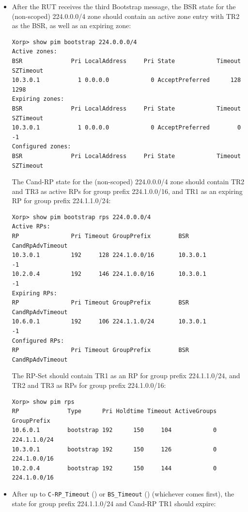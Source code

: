 \documentclass[11pt]{report}
\begin{document}
\begin{itemize}
  \item After the RUT receives the third Bootstrap message, the BSR state for
  the (non-scoped) 224.0.0.0/4 zone should contain an active zone entry with
  TR2 as the BSR, as well as an expiring zone:

\begin{verbatim}
Xorp> show pim bootstrap 224.0.0.0/4
Active zones:
BSR              Pri LocalAddress     Pri State            Timeout SZTimeout
10.3.0.1           1 0.0.0.0            0 AcceptPreferred      128      1298
Expiring zones:
BSR              Pri LocalAddress     Pri State            Timeout SZTimeout
10.3.0.1           1 0.0.0.0            0 AcceptPreferred        0        -1
Configured zones:
BSR              Pri LocalAddress     Pri State            Timeout SZTimeout
\end{verbatim}

  The Cand-RP state for the (non-scoped) 224.0.0.0/4 zone should
  contain TR2 and TR3 as active RPs for group prefix 224.1.0.0/16, and TR1 as
  an expiring RP for group prefix 224.1.1.0/24:

\begin{verbatim}
Xorp> show pim bootstrap rps 224.0.0.0/4
Active RPs:
RP               Pri Timeout GroupPrefix        BSR         CandRpAdvTimeout
10.3.0.1         192     128 224.1.0.0/16       10.3.0.1                  -1
10.2.0.4         192     146 224.1.0.0/16       10.3.0.1                  -1
Expiring RPs:
RP               Pri Timeout GroupPrefix        BSR         CandRpAdvTimeout
10.6.0.1         192     106 224.1.1.0/24       10.3.0.1                  -1
Configured RPs:
RP               Pri Timeout GroupPrefix        BSR         CandRpAdvTimeout
\end{verbatim}

  The RP-Set should contain TR1 as an RP for group prefix 224.1.1.0/24, and TR2
  and TR3 as RPs for group prefix 224.1.0.0/16:

\begin{verbatim}
Xorp> show pim rps 
RP              Type      Pri Holdtime Timeout ActiveGroups GroupPrefix       
10.6.0.1        bootstrap 192      150     104            0 224.1.1.0/24      
10.3.0.1        bootstrap 192      150     126            0 224.1.0.0/16      
10.2.0.4        bootstrap 192      150     144            0 224.1.0.0/16      
\end{verbatim}

  \item After up to \verb=C-RP_Timeout= ({\PimsmCRPTimeout}) or
  \verb=BS_Timeout= ({\PimsmBSTimeout}) (whichever comes first), the
  state for group prefix 224.1.1.0/24 and Cand-RP TR1 should expire:


\end{itemize}
\end{document}
